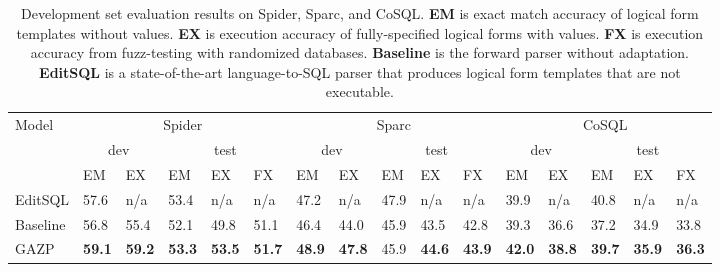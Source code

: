 \documentclass[11pt,a4paper]{article}
\begin{document}
\begin{table*}[t]
\centering
\addtolength{\tabcolsep}{-1.7pt}
\begin{tabular}{@{}llllllllllllllll@{}}
\toprule
\multirow{3}{*}{Model} & \multicolumn{5}{c}{Spider}       & \multicolumn{5}{c}{Sparc}        & \multicolumn{5}{c}{CoSQL}        \\ \cmidrule(l){2-6} \cmidrule(l){7-11} \cmidrule(l){12-16}
 & \multicolumn{2}{c}{dev} & \multicolumn{3}{c}{test} & \multicolumn{2}{c}{dev} & \multicolumn{3}{c}{test} & \multicolumn{2}{c}{dev} & \multicolumn{3}{c}{test} \\  \cmidrule(l){2-3} \cmidrule(l){4-6} \cmidrule(l){7-8} \cmidrule(l){9-11} \cmidrule(l){12-13} \cmidrule(l){14-16}
                       & EM   & EX   & EM   & EX   & FX   & EM   & EX   & EM   & EX   & FX   & EM   & EX   & EM   & EX   & FX   \\ \midrule
EditSQL                & 57.6 & n/a  & 53.4 & n/a  & n/a  & 47.2 & n/a  & 47.9 & n/a  & n/a  & 39.9 & n/a  & 40.8 & n/a  & n/a  \\ \midrule
Baseline               & 56.8 & 55.4 & 52.1 & 49.8 & 51.1 & 46.4 & 44.0 & 45.9 & 43.5 & 42.8 & 39.3 & 36.6 & 37.2 & 34.9 & 33.8 \\
GAZP                   & \textbf{59.1} & \textbf{59.2} & \textbf{53.3} & \textbf{53.5} & \textbf{51.7} & \textbf{48.9} & \textbf{47.8} & 45.9 & \textbf{44.6} & \textbf{43.9} & \textbf{42.0} & \textbf{38.8} & \textbf{39.7} & \textbf{35.9} & \textbf{36.3} \\ \bottomrule
\end{tabular}
\caption{
Development set evaluation results on Spider, Sparc, and CoSQL.
\textbf{EM} is exact match accuracy of logical form templates without values.
\textbf{EX} is execution accuracy of fully-specified logical forms with values.
\textbf{FX} is execution accuracy from fuzz-testing with randomized databases.
\textbf{Baseline} is the forward parser without adaptation.
\textbf{EditSQL} is a state-of-the-art language-to-SQL parser that produces logical form templates that are not executable.
}
\vspace{-0.1in}
\label{tab:results}
\end{table*}
\end{document}
